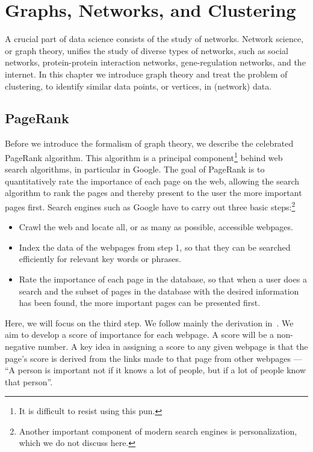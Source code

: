 

\chapter{Graphs, Networks, and Clustering}
\label{c:graphs}


A crucial part of data science consists of the study of networks. Network science, or graph theory, unifies the study of diverse types of networks, such as social networks, protein-protein interaction networks, gene-regulation networks, and the internet. In this chapter we introduce graph theory and treat the problem of clustering, to identify similar data points, or vertices, in (network) data.

\section{PageRank}

Before we introduce the formalism of graph theory, we describe the celebrated PageRank algorithm. This algorithm is a principal component\footnote{It is difficult to resist using this pun.} behind web search algorithms, in particular in Google. The goal of PageRank is to quantitatively rate the importance of each page on the web, allowing the search algorithm to rank the pages and thereby present to the user the more important pages first.
Search engines such as Google have to carry out three basic steps:\footnote{Another important component of modern search engines is personalization, which we do not discuss here.}
\begin{itemize}
\setlength{\parsep}{-0.3ex}
\setlength{\itemsep}{-0.3ex}
\item Crawl the web and locate all, or as many as possible, accessible webpages.
\item Index the data of the webpages from step 1, so that they can be searched efficiently for relevant
key words or phrases.
\item Rate the importance of each page in the database, so that when a user does
a search and the subset of pages in the database with the desired information
has been found, the more important pages can be presented first.
\end{itemize}
Here, we will focus on the third step. We follow mainly the derivation in~\cite{Bryan2006}. We aim to develop a score of importance for each webpage. A score will be a
non-negative number. A key idea in assigning a score to any given webpage is that the page's score is derived from the
links made to that page from other webpages --- ``A person is important not if it knows a lot of people, but if a lot of
people know that person''. 

